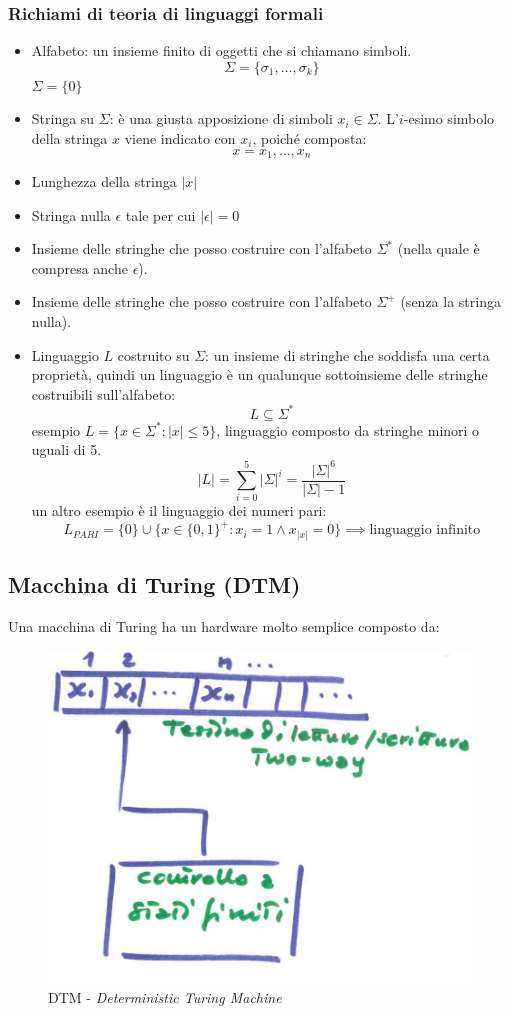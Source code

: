 \documentclass{article}
\begin{document}
\subsubsection{Richiami di teoria di linguaggi formali}
\begin{itemize}
    \item Alfabeto: un insieme finito di oggetti che si chiamano simboli.
    $$\Sigma=\{\sigma_1,\dots,\sigma_k\}$$
    $\Sigma=\{0\}$
    \item Stringa su $\Sigma$: è una giusta apposizione di simboli $x_i\in\Sigma$.
    L'$i$-esimo simbolo della stringa $x$ viene indicato con $x_i$, poiché composta:
    $$x=x_1,\dots,x_n$$
\item Lunghezza della stringa $|x|$
\item Stringa nulla $\epsilon$ tale per cui $|\epsilon|=0$
\item Insieme delle stringhe che posso costruire con l'alfabeto $\Sigma^*$ (nella quale è compresa anche $\epsilon$).
\item Insieme delle stringhe che posso costruire con l'alfabeto $\Sigma^+$ (senza la stringa nulla).
\item Linguaggio $L$ costruito su $\Sigma$: un insieme di stringhe che soddisfa una certa proprietà,
quindi un linguaggio è un qualunque sottoinsieme delle stringhe costruibili sull'alfabeto:
$$L\subseteq\Sigma^*$$
esempio $L=\{x\in\Sigma^*:|x|\leq 5\}$, linguaggio composto da stringhe minori o uguali di 5.
$$|L|=\sum_{i=0}^5|\Sigma|^i=\frac{{|\Sigma|}^6}{|\Sigma|-1}$$
un altro esempio è il linguaggio dei numeri pari:
$$L_{PARI}=\{0\} \cup \{x\in\{0,1\}^+ : x_i=1 \land x_{|x|}=0\} \implies\text{linguaggio infinito}$$
\end{itemize}

\subsection{Macchina di Turing (DTM)}
Una macchina di Turing ha un hardware molto semplice composto da:
\begin{figure}[H]
    \centering
    \includegraphics[scale=0.5]{images/DTM.png}
    \caption{DTM - \textit{Deterministic Turing Machine}}
\end{figure}
\end{document}
